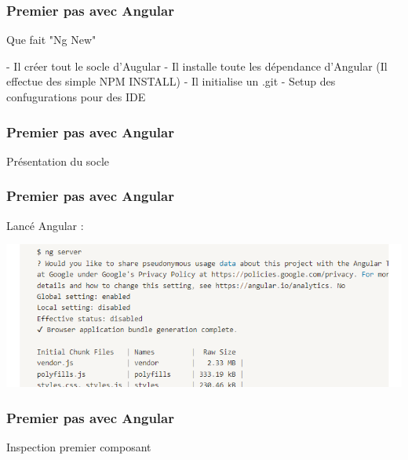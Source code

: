 \documentclass[10pt]{beamer}
\begin{document}
	\begin{frame}
		\frametitle{Premier pas avec Angular}

		Que fait "Ng New" \newline \newline

		- Il créer tout le socle d'Augular\newline
		- Il installe toute les dépendance d'Angular (Il effectue des simple NPM INSTALL)\newline
		- Il initialise un .git \newline
		- Setup des confugurations pour des IDE\newline

	\end{frame}

	\begin{frame}
		\frametitle{Premier pas avec Angular}

		\centering
		Présentation du socle \newline \newline

	\end{frame}

	\begin{frame}
		\frametitle{Premier pas avec Angular}

		Lancé Angular : \newline \newline

		\centering
		\includegraphics[width=15cm]{assets/ngserve} \newline

	\end{frame}

	\begin{frame}
		\frametitle{Premier pas avec Angular}

		\centering
		Inspection premier composant \newline \newline

	\end{frame}
\end{document}
